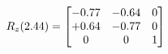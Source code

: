 \documentclass[preview]{standalone}
\begin{document}
\begin{align*}
\special{dvisvgm:raw <g id='unique000'>}R_{z}(2.44) = \begin{bmatrix}-0.77 & -0.64 & 0 \\+0.64 & -0.77 & 0 \\0 & 0 & 1\end{bmatrix}\special{dvisvgm:raw </g>}
\end{align*}
\end{document}
